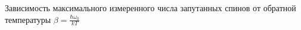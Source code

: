 Зависимость максимального измеренного числа запутанных спинов от обратной температуры
$\beta = \frac{\hbar\omega_0}{kT} $
